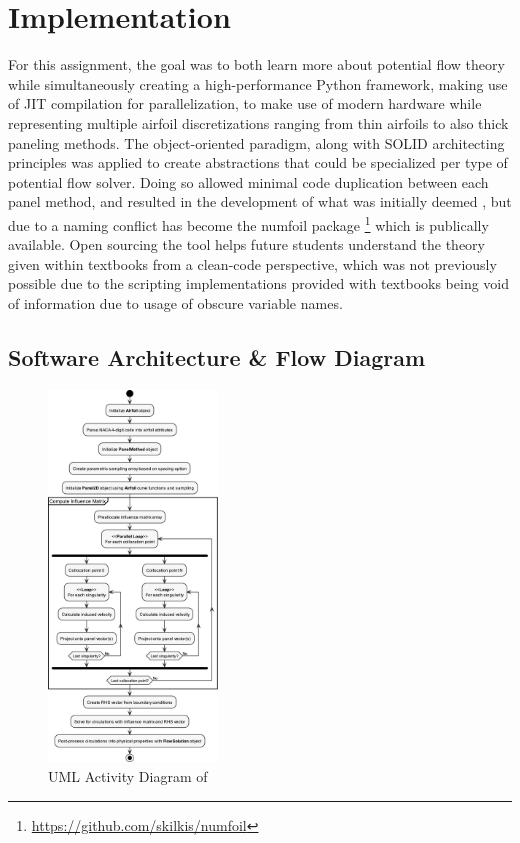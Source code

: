 \chapter{\numfoil Implementation}
For this assignment, the goal was to both learn more about potential flow
theory while simultaneously creating a high-performance Python framework,
making use of JIT compilation for parallelization, to make use of modern
hardware while representing multiple airfoil discretizations ranging from thin
airfoils to also thick paneling methods. The object-oriented paradigm, along
with SOLID architecting principles was applied to create abstractions that
could be specialized per type of potential flow solver. Doing so allowed
minimal code duplication between each panel method, and resulted in the
development of what was initially deemed \numfoil, but due to a naming conflict
has become the \textsf{numfoil} package
\footnote{\url{https://github.com/skilkis/numfoil}} which is publically
available. Open sourcing the tool helps future students understand the theory
given within textbooks from a clean-code perspective, which was not previously
possible due to the scripting implementations provided with textbooks being
void of information due to usage of obscure variable names.

\section{Software Architecture \& Flow Diagram}
\begin{figure}
    \vspace{-2em}
    \begin{center}
      \includegraphics[width=0.40\textwidth]{static/activity_diagram.pdf}
    \end{center}
    \caption{UML Activity Diagram of \numfoil}
    \label{fig:activity}
\end{figure}

